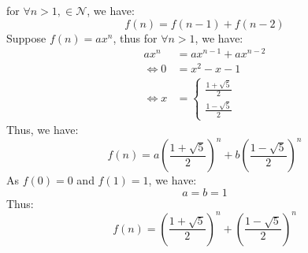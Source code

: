 \documentclass[class=minimal,border=4pt,preview,12pt]{standalone}
\begin{document}
for $\forall n > 1, \in \mathcal{N}$, we have:\\
$$f(n) = f(n-1) + f(n-2) $$
Suppose $f(n) = a x^n$, thus for $\forall n > 1$, we have:\\
\begin{align*}
ax^n & = ax^{n-1} + ax^{n-2} \\
\Leftrightarrow 0 &=x^2 - x - 1\\
\Leftrightarrow x &= \left\{
  \begin{array}{c}
     \frac{1 + \sqrt{5}}{2} \\
     \frac{1 - \sqrt{5}}{2}
  \end{array}\right.
\end{align*}
Thus, we have:\\
$$f(n) = a\left(\frac{1 + \sqrt{5}}{2}\right)^n + b\left(\frac{1 -
    \sqrt{5}}{2}\right)^n $$
As $f(0) = 0$ and $f(1) = 1$, we have:\\
$$a  = b = 1$$
Thus:\\
$$f(n) = \left(\frac{1 + \sqrt{5}}{2}\right)^n + \left(\frac{1 -
    \sqrt{5}}{2}\right)^n $$
\end{document}
